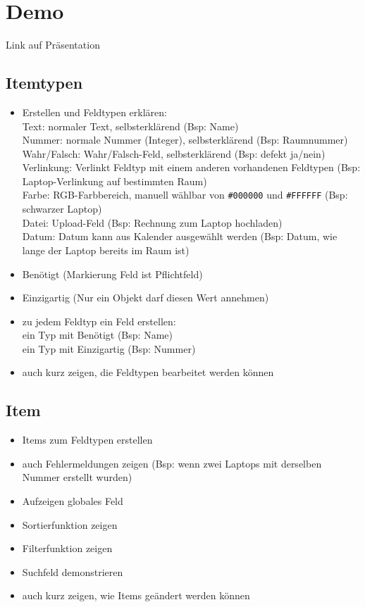 \documentclass[12pt,a4paper]{report}
\begin{document}
	\section*{Demo}
	Link auf Präsentation\\
	\subsection*{Itemtypen}
		\begin{itemize}
			\item Erstellen und Feldtypen erklären:\\
			Text: normaler Text, selbsterklärend (Bsp: Name)\\
			Nummer: normale Nummer (Integer), selbsterklärend (Bsp: Raumnummer)\\
			Wahr/Falsch: Wahr/Falsch-Feld, selbsterklärend (Bsp: defekt ja/nein)\\
			Verlinkung: Verlinkt Feldtyp mit einem anderen vorhandenen Feldtypen (Bsp: Laptop-Verlinkung auf bestimmten Raum)\\
			Farbe: RGB-Farbbereich, manuell wählbar von \texttt{\#000000} und \texttt{\#FFFFFF} (Bsp: schwarzer Laptop)\\
			Datei: Upload-Feld (Bsp: Rechnung zum Laptop hochladen)\\
			Datum: Datum kann aus Kalender ausgewählt werden (Bsp: Datum, wie lange der Laptop bereits im Raum ist)
			\item Benötigt (Markierung Feld ist Pflichtfeld)
			\item Einzigartig (Nur ein Objekt darf diesen Wert annehmen)
			\item zu jedem Feldtyp ein Feld erstellen:\\
			ein Typ mit Benötigt (Bsp: Name)\\
			ein Typ mit Einzigartig (Bsp: Nummer)\\
			\item auch kurz zeigen, die Feldtypen bearbeitet werden können
		\end{itemize}
	
	\subsection*{Item}
		\begin{itemize}
			\item Items zum Feldtypen erstellen
			\item auch Fehlermeldungen zeigen (Bsp: wenn zwei Laptops mit derselben Nummer erstellt wurden)
			\item Aufzeigen globales Feld
			\item Sortierfunktion zeigen
			\item Filterfunktion zeigen
			\item Suchfeld demonstrieren 
			\item auch kurz zeigen, wie Items geändert werden können
		\end{itemize}
	
\end{document}
